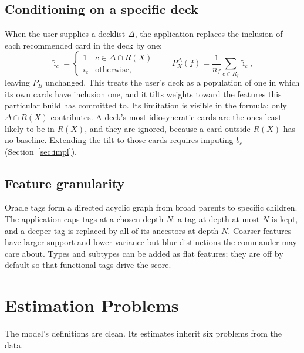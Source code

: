 \documentclass[11pt]{article}
\theoremstyle{remark}
\begin{document}
\subsection{Conditioning on a specific deck}
\noindent When the user supplies a decklist $\Delta$, the application replaces
the inclusion of each recommended card in the deck by one:
\begin{equation}
  \tilde{\imath}_c=\begin{cases}1 & c\in\Delta\cap R(X)\\ i_c & \text{otherwise,}\end{cases}
  \qquad
  P_X^{\Delta}(f)=\frac{1}{n_f}\sum_{c\in R_f}\tilde{\imath}_c ,
\end{equation}
leaving $P_B$ unchanged. This treats the user's deck as a population of one in
which its own cards have inclusion one, and it tilts weights toward the features
this particular build has committed to. Its limitation is visible in the formula:
only $\Delta\cap R(X)$ contributes. A deck's most idiosyncratic cards are the ones
least likely to be in $R(X)$, and they are ignored, because a card outside $R(X)$
has no baseline. Extending the tilt to those cards requires imputing $b_c$
(Section~\ref{sec:impl}).

\subsection{Feature granularity}
\noindent Oracle tags form a directed acyclic graph from broad parents to
specific children. The application caps tags at a chosen depth $N$: a tag at
depth at most $N$ is kept, and a deeper tag is replaced by all of its ancestors
at depth $N$. Coarser features have larger support and lower variance but blur
distinctions the commander may care about. Types and subtypes can be added as
flat features; they are off by default so that functional tags drive the score.

\section{Estimation Problems}\label{sec:est}
\noindent The model's definitions are clean. Its estimates inherit six problems
from the data.
\end{document}
